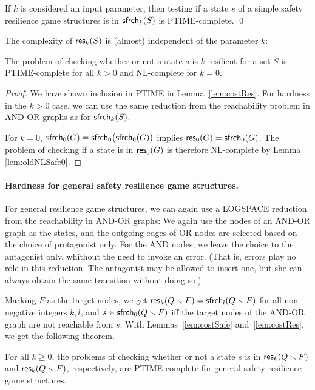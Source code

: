 \begin{lemma}
\label{lem:ptc}
If $k$ is considered an input parameter, then testing if a state $s$ of a simple safety resilience game structures
 is in $\mathsf{sfrch}_k(S)$ is PTIME-complete.
\qed
\end{lemma}


The complexity of $\mathsf{res}_k(S)$ is (almost) independent of the parameter $k$:

\begin{theorem}
The problem of checking whether or not a state $s$ is $k$-resilient for a set $S$ is PTIME-complete for all $k>0$ and NL-complete for $k=0$.
\end{theorem}

\begin{proof}
We have shown inclusion in PTIME in Lemma~\ref{lem:costRes}.
For hardness in the $k>0$ case, we can use the same reduction from the reachability problem in AND-OR graphs as for $\mathsf{sfrch}_k(S)$.

For $k=0$, $\mathsf{sfrch}_0(G)=\mathsf{sfrch}_0\big(\mathsf{sfrch}_0(G)\big)$ implies $\mathsf{res}_0(G)=\mathsf{sfrch}_0(G)$.
The problem of checking if a state is in $\mathsf{res}_0(G)$ is therefore NL-complete by Lemma \ref{lem:oldNLSafe0}.
\end{proof}

\paragraph{Hardness for general safety resilience game structures.}
For general resilience game structures, we can again use a LOGSPACE reduction from the reachability in AND-OR graphs:
We again use the nodes of an AND-OR graph as the states, and the outgoing edges of OR nodes are selected based on the choice of protagonist only.
For the AND nodes, we leave the choice to the antagonist only, whithout the need to invoke an error.
(That is, errors play no role in this reduction.
The antagonist may be allowed to insert one, but she can always obtain the same transition without doing so.)

Marking $F$ as the target nodes, we get $\mathsf{res}_k(Q \smallsetminus F) = \mathsf{sfrch}_l(Q \smallsetminus F)$ for all non-negative integers $k,l$, and $s \in \mathsf{sfrch}_0(Q \smallsetminus F)$ iff the target nodes of the AND-OR graph are not reachable from $s$.
With Lemmas~\ref{lem:costSafe} and~\ref{lem:costRes}, we get the following theorem.

\begin{theorem}
For all $k \geq 0$, the problems of checking whether or not a state $s$ is in $\mathsf{res}_k(Q \smallsetminus F)$ and $\mathsf{res}_k(Q \smallsetminus F)$, respectively, are PTIME-complete for general safety resilience game structures.
\end{theorem}
